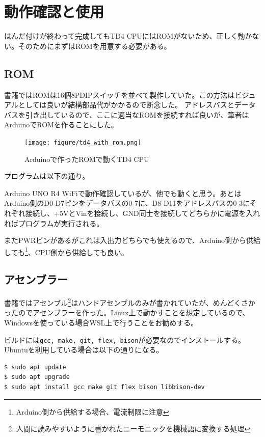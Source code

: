 \documentclass[xelatex,a5paper,ja=standard, openany]{bxjsbook}
\begin{document}
\chapter{動作確認と使用}
はんだ付けが終わって完成してもTD4 CPUにはROMがないため、正しく動かない。そのためにまずはROMを用意する必要がある。

\section{ROM}
書籍ではROMは16個8PDIPスイッチを並べて製作していた。この方法はビジュアルとしては良いが結構部品代がかかるので断念した。
アドレスバスとデータバスを引き出しているので、ここに適当なROMを接続すれば良いが、筆者はArduinoでROMを作ることにした。

\begin{figure}[h]
    \centering
    \texttt{[image: figure/td4\_with\_rom.png]}
    \caption{Arduinoで作ったROMで動くTD4 CPU}
    \label{fig:td4withROM}
\end{figure}

\newpage

プログラムは以下の通り。



Arduino UNO R4 WiFiで動作確認しているが、他でも動くと思う。あとはArduino側のD0-D7ピンをデータバスの0-7に、D8-D11をアドレスバスの0-3にそれぞれ接続し、+5VとVinを接続し、GND同士を接続してどちらかに電源を入れればプログラムが実行される。\par

\newpage

またPWRピンがあるがこれは入出力どちらでも使えるので、Arduino側から供給しても\footnote{Arduino側から供給する場合、電流制限に注意}、CPU側から供給しても良い。

\section{アセンブラー}
書籍ではアセンブル\footnote{人間に読みやすいように書かれたニーモニックを機械語に変換する処理}はハンドアセンブルのみが書かれていたが、めんどくさかったのでアセンブラーを作った。Linux上で動かすことを想定しているので、Windowsを使っている場合WSL上で行うことをお勧めする。

ビルドには\texttt{gcc, make, git, flex, bison}が必要なのでインストールする。Ubuntuを利用している場合は以下の通りになる。
\begin{lstlisting}
$ sudo apt update
$ sudo apt upgrade
$ sudo apt install gcc make git flex bison libbison-dev
\end{lstlisting}
\end{document}
